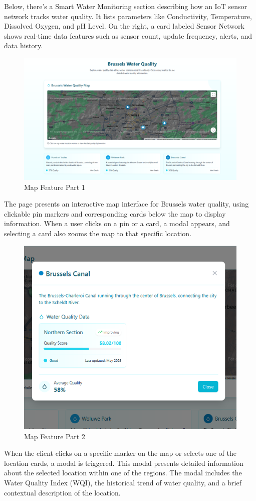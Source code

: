 Below, there's a Smart Water Monitoring section describing how an IoT sensor network tracks water quality. It lists parameters like Conductivity, Temperature, Dissolved Oxygen, and pH Level. On the right, a card labeled Sensor Network shows real-time data features such as sensor count, update frequency, alerts, and data history.
\begin{figure}[H]
    \centering
    \includegraphics[width=0.75\linewidth]{Figures/clientt4.png}
    \caption{Map Feature Part 1}
    \label{fig:enter-label}
\end{figure}
The page presents an interactive map interface for Brussels water quality, using clickable pin markers and corresponding cards below the map to display information. When a user clicks on a pin or a card, a modal appears, and selecting a card also zooms the map to that specific location.
\begin{figure}[H]
    \centering
    \includegraphics[width=0.75\linewidth]{Figures/clientt5.png}
    \caption{Map Feature Part 2}
    \label{fig:enter-label}
\end{figure}
When the client clicks on a specific marker on the map or selects one of the location cards, a modal is triggered. This modal presents detailed information about the selected location within one of the regions. The modal includes the Water Quality Index (WQI), the historical trend of water quality, and a brief contextual description of the location.
